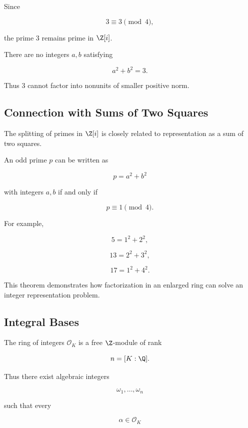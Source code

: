 Since

\[ 3\equiv3\pmod4, \]

the prime \(3\) remains prime in \(\Z[i]\).

There are no integers \(a,b\) satisfying

\[ a^2+b^2=3. \]

Thus \(3\) cannot factor into nonunits of smaller positive norm.

\subsection{Connection with Sums of Two Squares}
\label{subsec:sums-two-squares-connection}

The splitting of primes in \(\Z[i]\) is closely related to representation as
a sum of two squares.

\begin{theorem}
An odd prime \(p\) can be written as

\[ p=a^2+b^2 \]

with integers \(a,b\) if and only if

\[ p\equiv1\pmod4. \]
\end{theorem}

For example,

\[ 5=1^2+2^2, \]

\[ 13=2^2+3^2, \]

\[ 17=1^2+4^2. \]

This theorem demonstrates how factorization in an enlarged ring can solve an
integer representation problem.

\subsection{Integral Bases}
\label{subsec:integral-bases}

The ring of integers \(\mathcal O_K\) is a free \(\Z\)-module of rank

\[ n=[K:\Q]. \]

Thus there exist algebraic integers

\[ \omega_1,\ldots,\omega_n \]

such that every

\[ \alpha\in\mathcal O_K \]

